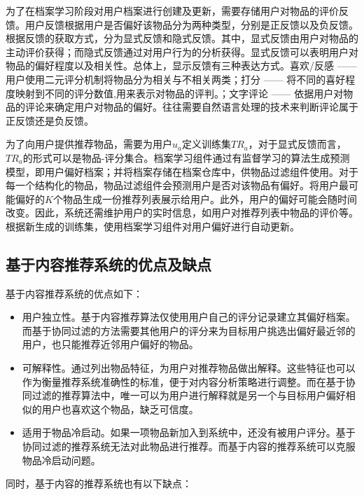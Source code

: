 为了在档案学习阶段对用户档案进行创建及更新，需要存储用户对物品的评价反馈\cite{goldberg1992using}。用户反馈根据用户是否偏好该物品分为两种类型，分别是正反馈以及负反馈\cite{holte1996inferring}。根据反馈的获取方式，分为显式反馈和隐式反馈。其中，显式反馈由用户对物品的主动评价获得；而隐式反馈通过对用户行为的分析获得。显式反馈可以表明用户对物品的偏好程度以及相关性。总体上，显示反馈有三种表达方式。喜欢/反感 —— 用户使用二元评分机制将物品分为相关与不相关两类\cite{billsus1999hybrid}；打分 —— 将不同的喜好程度映射到不同的评分数值,用来表示对物品的评判\cite{pazzani1996syskill}。；文字评论 —— 依据用户对物品的评论来确定用户对物品的偏好\cite{resnick1994grouplens}。往往需要自然语言处理的技术来判断评论属于正反馈还是负反馈。

为了向用户提供推荐物品，需要为用户$u_a$定义训练集$TR_a$，对于显式反馈而言，$TR_a$的形式可以是物品-评分集合。档案学习组件通过有监督学习的算法生成预测模型，即用户偏好档案；并将档案存储在档案仓库中，供物品过滤组件使用。对于每一个结构化的物品，物品过滤组件会预测用户是否对该物品有偏好。将用户最可能偏好的$K$个物品生成一份推荐列表展示给用户。此外，用户的偏好可能会随时间改变。因此，系统还需维护用户的实时信息，如用户对推荐列表中物品的评价等。根据新生成的训练集，使用档案学习组件对用户偏好进行自动更新。

\subsection{基于内容推荐系统的优点及缺点}

基于内容推荐系统的优点如下：

\begin{itemize}
 \item 用户独立性。基于内容推荐算法仅使用用户自己的评分记录建立其偏好档案。而基于协同过滤的方法需要其他用户的评分来为目标用户挑选出偏好最近邻的用户，也只能推荐近邻用户偏好的物品。
 \item 可解释性。通过列出物品特征，为用户对推荐物品做出解释。这些特征也可以作为衡量推荐系统准确性的标准，便于对内容分析策略进行调整。而在基于协同过滤的推荐算法中，唯一可以为用户进行解释就是另一个与目标用户偏好相似的用户也喜欢这个物品，缺乏可信度。
 \item 适用于物品冷启动。如果一项物品新加入到系统中，还没有被用户评分。基于协同过滤的推荐系统无法对此物品进行推荐。而基于内容的推荐系统可以克服物品冷启动问题。
\end{itemize}

同时，基于内容的推荐系统也有以下缺点：

